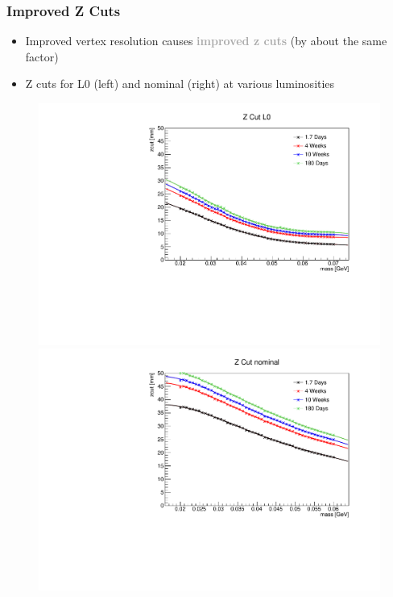 \documentclass{beamer}
\begin{document}

\begin{frame}
\frametitle{Improved Z Cuts}
\begin{itemize}
\item Improved vertex resolution causes \textcolor{darkgray}{\textbf{improved z cuts}} (by about the same factor)
\item Z cuts for L0 (left) and nominal (right) at various luminosities
\end{itemize}
\begin{figure}
\includegraphics[width=0.55\linewidth]{figs/zcut_L0_loose.pdf}
\includegraphics[width=0.55\linewidth]{figs/zcut_nominal.pdf}
\end{figure}

\end{frame}

\end{document}
